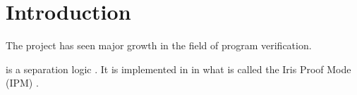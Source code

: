 \documentclass[thesis.tex]{subfiles}
\begin{document}
\chapter{Introduction}
\label{ch:introduction}

The \iris project \cite{jungIrisGroundModular2018} has seen major growth in the field of program verification.

\iris is a separation logic \cite*{jungIrisMonoidsInvariants2015a,jungHigherorderGhostState2016,krebbersEssenceHigherOrderConcurrent2017,jungIrisGroundModular2018}. It is implemented in \coq in what is called the Iris Proof Mode (IPM) \cite*{krebbersInteractiveProofsHigherorder2017,krebbersMoSeLGeneralExtensible2018}.
\end{document}
